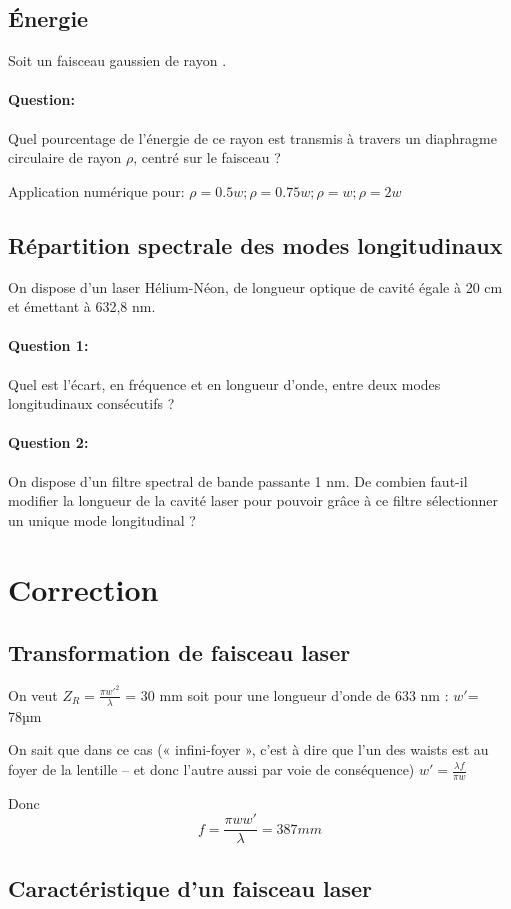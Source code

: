 \documentclass{book}
\begin{document}
\subsection{Énergie}
Soit un faisceau gaussien de rayon . 
\paragraph{Question:}
Quel pourcentage de l'énergie de ce rayon est transmis à travers un diaphragme circulaire de rayon $\rho$, centré sur le faisceau ?

Application numérique pour: $\rho=0.5w; \rho = 0.75w; \rho=w; \rho = 2w$

\subsection{Répartition spectrale des modes longitudinaux}
On dispose d'un laser Hélium-Néon, de longueur optique de cavité égale à 20 cm et émettant à 632,8 nm. 
\paragraph{Question 1:}
Quel est l'écart, en fréquence et en longueur d'onde, entre deux modes longitudinaux consécutifs ? 
\paragraph{Question 2:}
On dispose d'un filtre spectral de bande passante 1 nm. De combien faut-il modifier la longueur de la cavité laser pour pouvoir grâce à ce filtre sélectionner un unique mode longitudinal ? 


\section{Correction}

\subsection{Transformation de faisceau laser}
On veut $Z_R=\frac {\pi w'^2}{\lambda}$ = 30 mm soit pour une longueur d'onde de 633 nm : $w'$= 78µm

On sait que dans ce cas (« infini-foyer », c'est à dire que l'un des waists est au foyer de la lentille – et donc l'autre aussi par voie de conséquence) $w' = \frac {\lambda f}{\pi w}$

Donc 
$$f=\frac{\pi w w'}\lambda = 387mm$$

\subsection{Caractéristique d'un faisceau laser}
\end{document}
